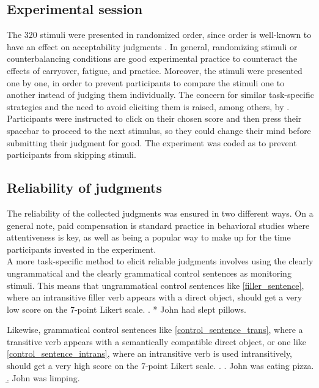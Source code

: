 \subsection{Experimental session} 
The 320 stimuli were presented in randomized order, since order is well-known to have an effect on acceptability judgments \parencite{Myers2009, Juzek2016}. In general, randomizing stimuli or counterbalancing conditions are good experimental practice to counteract the effects of carryover, fatigue, and practice. Moreover, the stimuli were presented one by one, in order to prevent participants to compare the stimuli one to another instead of judging them individually. The concern for similar task-specific strategies and the need to avoid eliciting them is raised, among others, by \textcite{Myers2009}.\\
Participants were instructed to click on their chosen score and then press their spacebar to proceed to the next stimulus, so they could change their mind before submitting their judgment for good. The experiment was coded as to prevent participants from skipping stimuli.

\subsection{Reliability of judgments} 
The reliability of the collected judgments was ensured in two different ways. On a general note, paid compensation is standard practice in behavioral studies where attentiveness is key, as well as being a popular way to make up for the time participants invested in the experiment.\\
A more task-specific method to elicit reliable judgments involves using the clearly ungrammatical and the clearly grammatical control sentences as monitoring stimuli. This means that ungrammatical control sentences like \ref{filler_sentence}, where an intransitive filler verb appears with a direct object, should get a very low score on the 7-point Likert scale.
\ex. \label{filler_sentence} * John had slept pillows.

Likewise, grammatical control sentences like \ref{control_sentence_trans}, where a transitive verb appears with a semantically compatible direct object, or one like \ref{control_sentence_intrans}, where an intransitive verb is used intransitively, should get a very high score on the 7-point Likert scale.
\ex. \a. \label{control_sentence_trans} John was eating pizza.
\b. \label{control_sentence_intrans} John was limping.

